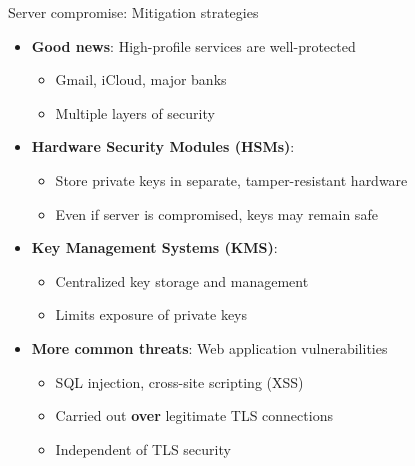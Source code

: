 \documentclass[aspectratio=169, lualatex, handout]{beamer}
\begin{document}
\begin{frame}{Server compromise: Mitigation strategies}
	\begin{itemize}
		\item \textbf{Good news}: High-profile services are well-protected
		      \begin{itemize}
			      \item Gmail, iCloud, major banks
			      \item Multiple layers of security
		      \end{itemize}
		\item \textbf{Hardware Security Modules (HSMs)}:
		      \begin{itemize}
			      \item Store private keys in separate, tamper-resistant hardware
			      \item Even if server is compromised, keys may remain safe
		      \end{itemize}
		\item \textbf{Key Management Systems (KMS)}:
		      \begin{itemize}
			      \item Centralized key storage and management
			      \item Limits exposure of private keys
		      \end{itemize}
		\item \textbf{More common threats}: Web application vulnerabilities
		      \begin{itemize}
			      \item SQL injection, cross-site scripting (XSS)
			      \item Carried out \textbf{over} legitimate TLS connections
			      \item Independent of TLS security
		      \end{itemize}
	\end{itemize}
\end{frame}
\end{document}
